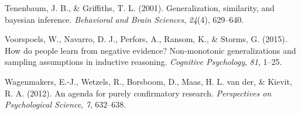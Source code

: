 \documentclass[english,doc]{apa6}
\begin{document}
\leavevmode\hypertarget{ref-tenenbaum2001generalization}{}%
Tenenbaum, J. B., \& Griffiths, T. L. (2001). Generalization, similarity, and bayesian inference. \emph{Behavioral and Brain Sciences}, \emph{24}(4), 629--640.

\leavevmode\hypertarget{ref-voorspoels2015people}{}%
Voorspoels, W., Navarro, D. J., Perfors, A., Ransom, K., \& Storms, G. (2015). How do people learn from negative evidence? Non-monotonic generalizations and sampling assumptions in inductive reasoning. \emph{Cognitive Psychology}, \emph{81}, 1--25.

\leavevmode\hypertarget{ref-Wagenmakers2012}{}%
Wagenmakers, E.-J., Wetzels, R., Borsboom, D., Maas, H. L. van der, \& Kievit, R. A. (2012). An agenda for purely confirmatory research. \emph{Perspectives on Psychological Science}, \emph{7}, 632--638.
\end{document}
